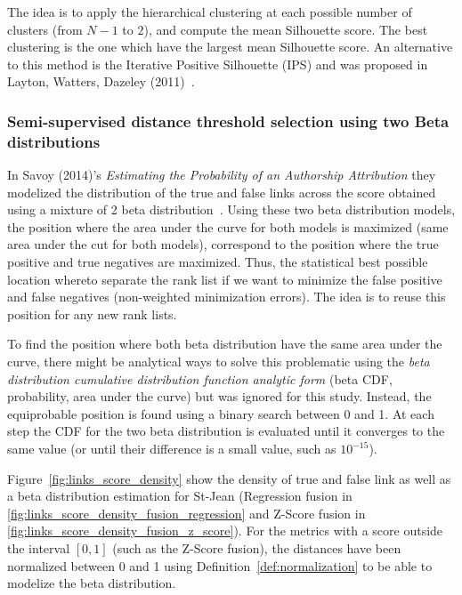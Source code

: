 The idea is to apply the hierarchical clustering at each possible number of clusters (from $N - 1$ to $2$), and compute the mean Silhouette score.
The best clustering is the one which have the largest mean Silhouette score.
An alternative to this method is the Iterative Positive Silhouette (IPS) and was proposed in Layton, Watters, Dazeley (2011)~\cite{automated_unsupervised}.

\subsubsection{Semi-supervised distance threshold selection using two Beta distributions}

In Savoy (2014)'s \textit{Estimating the Probability of an Authorship Attribution} they modelized the distribution of the true and false links across the score obtained using a mixture of 2 beta distribution~\cite{savoy_probability}.
Using these two beta distribution models, the position where the area under the curve for both models is maximized (same area under the cut for both models), correspond to the position where the true positive and true negatives are maximized.
Thus, the statistical best possible location whereto separate the rank list if we want to minimize the false positive and false negatives (non-weighted minimization errors).
The idea is to reuse this position for any new rank lists.

To find the position where both beta distribution have the same area under the curve, there might be analytical ways to solve this problematic using the \textit{beta distribution cumulative distribution function analytic form} (beta CDF, probability, area under the curve) but was ignored for this study.
Instead, the equiprobable position is found using a binary search between 0 and 1.
At each step the CDF for the two beta distribution is evaluated until it converges to the same value (or until their difference is a small value, such as $10^{-15}$).

Figure~\ref{fig:links_score_density} show the density of true and false link as well as a beta distribution estimation for St-Jean (Regression fusion in \ref{fig:links_score_density_fusion_regression} and Z-Score fusion in \ref{fig:links_score_density_fusion_z_score}).
For the metrics with a score outside the interval $[0, 1]$ (such as the Z-Score fusion), the distances have been normalized between 0 and 1 using Definition~\ref{def:normalization} to be able to modelize the beta distribution.

